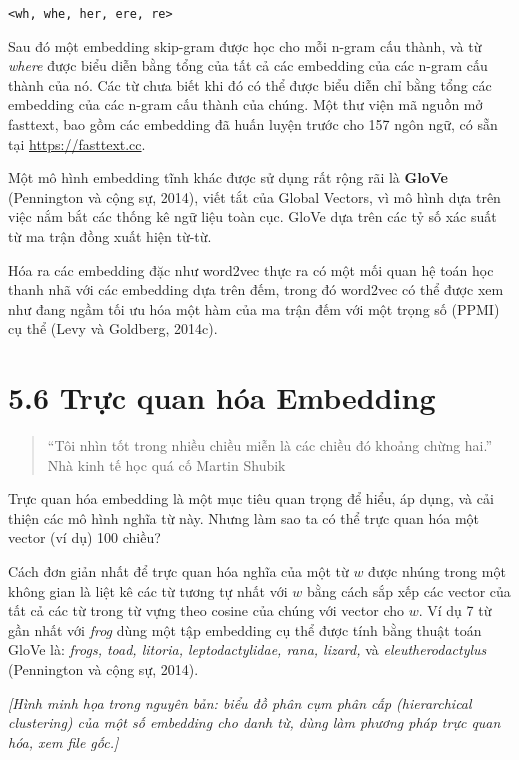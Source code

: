 \begin{center}
\texttt{<wh, whe, her, ere, re>}
\end{center}

Sau đó một embedding skip-gram được học cho mỗi n-gram cấu thành, và từ \emph{where} được biểu diễn bằng tổng của tất cả các embedding của các n-gram cấu thành của nó. Các từ chưa biết khi đó có thể được biểu diễn chỉ bằng tổng các embedding của các n-gram cấu thành của chúng. Một thư viện mã nguồn mở fasttext, bao gồm các embedding đã huấn luyện trước cho 157 ngôn ngữ, có sẵn tại \url{https://fasttext.cc}.

Một mô hình embedding tĩnh khác được sử dụng rất rộng rãi là \textbf{GloVe} (Pennington và cộng sự, 2014), viết tắt của Global Vectors, vì mô hình dựa trên việc nắm bắt các thống kê ngữ liệu toàn cục. GloVe dựa trên các tỷ số xác suất từ ma trận đồng xuất hiện từ-từ.

Hóa ra các embedding đặc như word2vec thực ra có một mối quan hệ toán học thanh nhã với các embedding dựa trên đếm, trong đó word2vec có thể được xem như đang ngầm tối ưu hóa một hàm của ma trận đếm với một trọng số (PPMI) cụ thể (Levy và Goldberg, 2014c).

\section{5.6 Trực quan hóa Embedding}

\begin{quote}
``Tôi nhìn tốt trong nhiều chiều miễn là các chiều đó khoảng chừng hai.'' \\
Nhà kinh tế học quá cố Martin Shubik
\end{quote}

Trực quan hóa embedding là một mục tiêu quan trọng để hiểu, áp dụng, và cải thiện các mô hình nghĩa từ này. Nhưng làm sao ta có thể trực quan hóa một vector (ví dụ) 100 chiều?

Cách đơn giản nhất để trực quan hóa nghĩa của một từ $w$ được nhúng trong một không gian là liệt kê các từ tương tự nhất với $w$ bằng cách sắp xếp các vector của tất cả các từ trong từ vựng theo cosine của chúng với vector cho $w$. Ví dụ 7 từ gần nhất với \emph{frog} dùng một tập embedding cụ thể được tính bằng thuật toán GloVe là: \emph{frogs, toad, litoria, leptodactylidae, rana, lizard,} và \emph{eleutherodactylus} (Pennington và cộng sự, 2014).

\textit{[Hình minh họa trong nguyên bản: biểu đồ phân cụm phân cấp (hierarchical clustering) của một số embedding cho danh từ, dùng làm phương pháp trực quan hóa, xem file gốc.]}

